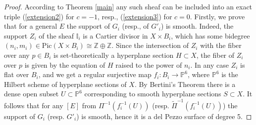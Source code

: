 \documentclass{amsart}
\begin{document}
\begin{proof}According to Theorem \ref{main} any such sheaf can be included into an exact triple (\ref{extension2}) for $c=-1$, resp., (\ref{extension3}) for $c=0$. Firstly, we prove that for a general $E$ the support of $G_i$ (resp., of $G'_i$) is smooth. Indeed, the support $Z_i$ of the sheaf $\mathbb I_i$ is a Cartier divisor in $X\times B_i$, which has some bidegree $(n_i,m_i)\in\mathrm{Pic}(X\times B_i)\cong\mathbb Z\oplus\mathbb Z$. Since the intersection of $Z_i$ with the fiber over any $p\in B_i$ is set-theoretically a hyperplane section $H\subset X$, the fiber of $Z_i$ over $p$ is given by the equation of $H$ raised to the power of $n_i$. In any case $Z_i$ is flat over $B_i$, and we get a regular surjective map $f_i:B_i\to\mathbb P^6$, where $\mathbb P^6$ is the Hilbert scheme of hyperplane sections of $X$. By Bertini's Theorem there is a dense open subset $U\subset\mathbb P^6$ corresponding to smooth hyperplane sections $S\subset X$. It follows that for any $[E]$ from $\Pi^{-1}(f_i^{-1}(U))$ (resp. $\widetilde{\Pi}^{-1}(f_i^{-1}(U))$) the support of $G_i$ (resp. $G'_i$) is smooth, hence it is a del Pezzo surface of degree 5.
	

\end{proof}
\end{document}
